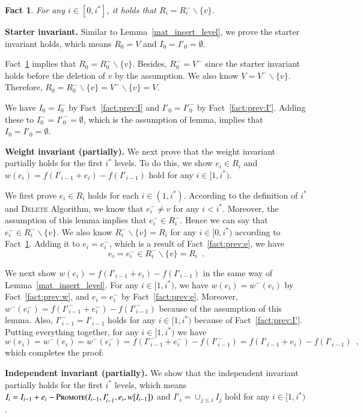 \documentclass[11pt]{article}
\newtheorem{fact}[theorem]{Fact}
\newcommand{\replacementTester}{\textsc{Promote}}
\newcommand{\deletev}{{\textsc{Delete}}}
\begin{document}
\begin{fact}
\label{fact:prev:R}
For any $i \in [0, i^*]$, it holds that $R_i = R_i^- \backslash \{v\}$.
\end{fact}


\textbf{Starter invariant. }
Similar to Lemma~\ref{mat_insert_level}, we prove the starter invariant holds, which means $R_0=V$ and $I_0=I'_0=\emptyset$.

Fact~\ref{fact:prev:R} implies that $R_0 = R_0^- \backslash \{v\}$.
Besides, $ R_0^- = V^-$ since the starter invariant holds before the deletion of $v$ by the assumption.
We also know $V=V^- \backslash \{v\}$. Therefore, 
$R_0 = R_0^- \backslash \{v\}=V^- \backslash \{v\}= V$.

We have $I_0=I_0^-$ by Fact~\ref{fact:prev:I} and ${I'}_0={I'}_0^-$ by Fact~\ref{fact:prev:I'}.
Adding these to $I_0^-={I'}_0^-=\emptyset$, which is the assumption of lemma, implies that $I_0 = {I'}_0 = \emptyset$.


\textbf{Weight invariant  (partially). }
We next prove that the weight invariant partially holds for the first $i^*$ levels.
To do this, we show $e_i \in R_i$ and $w(e_i)=f(I'_{i - 1} + e_i) - f(I'_{i - 1})$ hold for any $i\in [1, i^*)$.

We first prove  $e_i \in R_i$ holds for each $i \in (1, i^*)$.
According to the definition of $i^*$ and \deletev{} Algorithm, we know that $e_i^- \ne v$ for any $i < i^*$.
Moreover, the assumption of this lemma implies that $e_i^-\in R_i^-$.
Hence we can say that $e_i^- \in R_i^- \backslash \{v\}$. 
We also know $R_i^- \backslash \{v\} =  R_i$ for any $i\in[0,i^*)$ according to Fact~\ref{fact:prev:R}.
Adding it to $e_i= e_i^-$, which is a result of  Fact~\ref{fact:prev:e}, we have
$$
e_i= e_i^- \in R_i^- \backslash \{v\}  =  R_i \enspace .
$$

We next show $w(e_i) = f(I'_{i - 1} + e_i) - f(I'_{i - 1})$ in  the  same way of Lemma~\ref{mat_insert_level}.
For any $i\in[1,i^*)$,  we have $w(e_i) = w^-(e_i)$ by Fact~\ref{fact:prev:w}, and $e_i=e_i^-$ by Fact~\ref{fact:prev:e}.
Moreover, $w^-(e_i^-) = f(I'^-_{i - 1} + e_i^-) - f(I'^-_{i - 1})$ because of the assumption of this lemma.
Also, $I'^-_{i - 1}=I'_{i - 1}$ holds for any $i\in[1,i^*)$ because of Fact~\ref{fact:prev:I'}.
Putting everything together, for any $i\in[1,i^*)$ we have
$$
w(e_i) = w^-(e_i) 
= w^-(e_i^-)
= f(I'^-_{i - 1} + e_i^-) - f(I'^-_{i - 1}) 
= f(I'_{i - 1} + e_i) - f(I'_{i - 1}) \enspace, 
$$
which completes the proof.


\textbf{Independent invariant (partially). }
We show that the independent invariant partially holds for the first $i^*$ levels,  which means $I_i = I_{i-1} + e_i - \replacementTester{}(I_{i-1}, I'_{i-1}, e_i, w[I_{i - 1}])$ and $I'_i = \cup_{j \le i} I_j$ hold for any $i\in[1,i^*)$.
\end{document}
